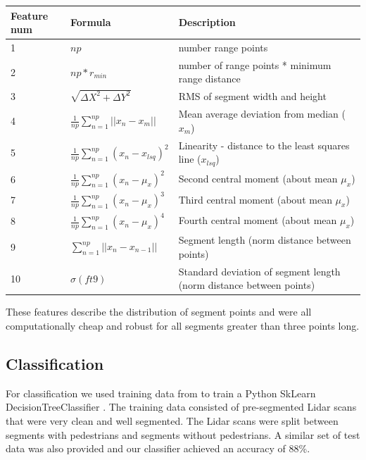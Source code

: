 \documentclass[10pt,twocolumn,letterpaper]{article}
\begin{document}
  \renewcommand{\arraystretch}{1.5}
  \begin{center}
    \begin{tabular}{ | p{1cm} | l | p{2.9cm} |}
      \hline
      Feature num & Formula & Description \\ \hline
      1 & $ np $ & number range points \\ \hline
      2 & $np*r_{min}$ & number of range points * minimum range distance \\ \hline
      3 & $\sqrt{ \Delta X^2 + \Delta Y^2} $ & RMS of segment width and height
      \\ \hline
      4 & $ \frac{1}{np}\sum_{n=1}^{np} || x_n - x_m|| $ & Mean average deviation
      from median ($x_m$) \\ \hline
      5 & $ \frac{1}{np}\sum_{n=1}^{np} (x_n - x_{lsq})^2 $ & Linearity -
      distance to the least squares line ($ x_{lsq}$) \\ \hline
      6 & $ \frac{1}{np}\sum_{n=1}^{np} (x_n - \mu_x)^2 $ & Second central
      moment (about mean $\mu_x$) \\ \hline
      7 & $ \frac{1}{np}\sum_{n=1}^{np} (x_n - \mu_x)^3 $ & Third central
      moment (about mean $\mu_x$) \\ \hline
      8 & $ \frac{1}{np}\sum_{n=1}^{np} (x_n - \mu_x)^4 $ & Fourth central
      moment (about mean $\mu_x$) \\ \hline
      9 & $ \sum_{n=1}^{np} ||x_n - x_{n-1}|| $ & Segment length (norm distance
      between points) \\ \hline
      10 & $ \sigma(ft9) $ & Standard deviation of
      segment length (norm distance between points) \\ \hline
    \end{tabular}
  \end{center}

  These features describe the distribution of segment points and were all
  computationally cheap and robust for all segments greater than three points long.

  \subsection{Classification}
  For classification we used training data from \cite{dataset} to train a Python
  SkLearn DecisionTreeClassifier \cite{sklearn}. The training data consisted of
  pre-segmented Lidar scans that were very clean and well segmented. The Lidar
  scans were split between segments with pedestrians and segments without
  pedestrians. A similar set of test data was also provided and our classifier
  achieved an accuracy of 88\%.
\end{document}

